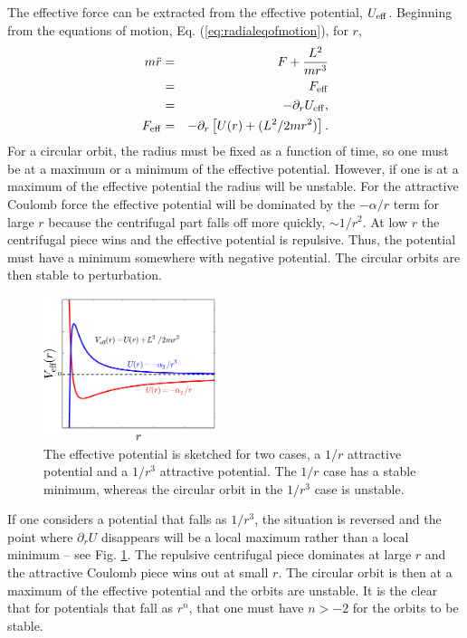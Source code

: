The effective force can be extracted from the effective potential, $U_{\rm eff}$. Beginning from the equations of motion, Eq. (\ref{eq:radialeqofmotion}), for $r$,
\begin{eqnarray}
m\ddot{r}&=&F+\frac{L^2}{mr^3}\\
\nonumber
&=&F_{\rm eff}\\
\nonumber
&=&-\partial_rU_{\rm eff},\\
\nonumber
F_{\rm eff}&=&-\partial_r\left[U(r)+(L^2/2mr^2)\right].
\end{eqnarray}
For a circular orbit, the radius must be fixed as a function of time, so one must be at a maximum or a minimum of the effective potential. However, if one is at a maximum of the effective potential the radius will be unstable. For the attractive Coulomb force the effective potential will be dominated by the $-\alpha/r$ term for large $r$ because the centrifugal part falls off more quickly, $\sim 1/r^2$. At low $r$ the centrifugal piece wins and the effective potential is repulsive. Thus, the potential must have a minimum somewhere with negative potential. The circular orbits are then stable to perturbation.

\begin{figure}
\centerline{\includegraphics[width=0.45\textwidth]{figs/Veff}}
\caption{\label{fig:Veff}The effective potential is sketched for two cases, a $1/r$ attractive potential and a $1/r^3$ attractive potential. The $1/r$ case has a stable minimum, whereas the circular orbit in the $1/r^3$ case is unstable. 
}
\end{figure}
If one considers a potential that falls as $1/r^3$, the situation is reversed and the point where $\partial_rU$ disappears will be a local maximum rather than a local minimum -- see Fig. \ref{fig:Veff}. The repulsive centrifugal piece dominates at large $r$ and the attractive Coulomb piece wins out at small $r$. The circular orbit is then at a maximum of the effective potential and the orbits are unstable. It is the clear that for potentials that fall as $r^n$, that one must have $n>-2$ for the orbits to be stable.

